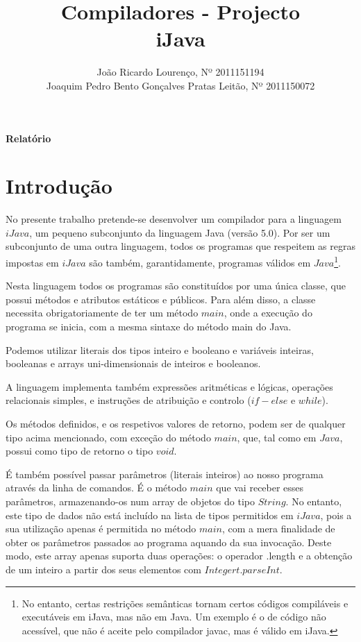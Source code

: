 \documentclass[11pt,a4paper]{article}
\title{\bf{Compiladores - Projecto}\vspace{50mm}\\iJava\vspace{80mm}}
\author{
João Ricardo Lourenço, Nº 2011151194\\
Joaquim Pedro Bento Gonçalves Pratas Leitão, Nº 2011150072}
\begin{document}
\maketitle
\centerline{\textbf{Relatório}}
\pagebreak

\printindex

\renewcommand*\contentsname{Índice}
\tableofcontents

\pagebreak


\section{Introdução}

No presente trabalho pretende-se desenvolver um compilador para a linguagem $iJava$, um pequeno subconjunto da linguagem Java (versão 5.0). Por ser um subconjunto de uma outra linguagem, todos os programas que respeitem as regras impostas em $iJava$ são também, garantidamente, programas válidos em $Java$\footnote{No entanto, certas restrições semânticas tornam certos códigos compiláveis e executáveis em iJava, mas não em Java. Um exemplo é o de código não acessível, que não é aceite pelo compilador javac, mas é válido em iJava.}.

Nesta linguagem todos os programas são constituídos por uma única classe, que possui métodos e atributos estáticos e públicos. Para além disso, a classe necessita obrigatoriamente de ter um método $main$, onde a execução do programa se inicia, com a mesma sintaxe do método main do Java. 

Podemos utilizar literais dos tipos inteiro e booleano e variáveis inteiras, booleanas e arrays uni-dimensionais de inteiros e booleanos.

A linguagem implementa também expressões aritméticas e lógicas, operações relacionais simples, e instruções de atribuição e controlo ($if-else$ e $while$).

Os métodos definidos, e os respetivos valores de retorno, podem ser de qualquer tipo acima mencionado, com exceção do método $main$, que, tal como em $Java$, possui como tipo de retorno o tipo $void$.

É também possível passar parâmetros (literais inteiros) ao nosso programa através da linha de comandos. É o método $main$ que vai receber esses parâmetros, armazenando-os num array de objetos do tipo $String$. No entanto, este tipo de dados não está incluído na lista de tipos permitidos em $iJava$, pois a sua utilização apenas é permitida no método $main$, com a mera finalidade de obter os parâmetros passados ao programa aquando da sua invocação. Deste modo, este array apenas suporta duas operações: o operador .length e a obtenção de um inteiro a partir dos seus elementos com $Integert.parseInt$.
\end{document}
